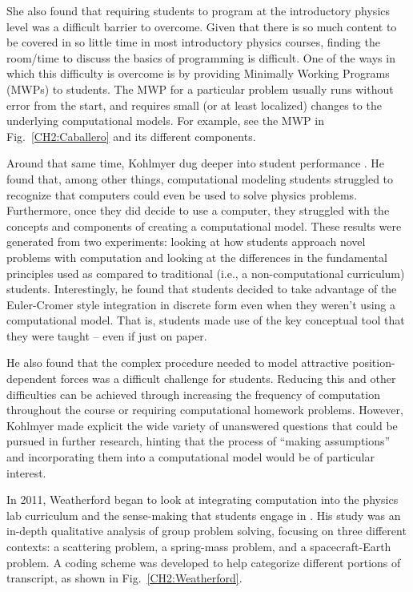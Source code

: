 \documentclass{msuphddissertation}
\begin{document}
\begin{doublespace}
She also found that requiring students to program at the introductory physics level was a difficult barrier to overcome.  Given that there is so much content to be covered in so little time in most introductory physics courses, finding the room/time to discuss the basics of programming is difficult.  One of the ways in which this difficulty is overcome is by providing Minimally Working Programs (MWPs) to students.  The MWP for a particular problem usually runs without error from the start, and requires small (or at least localized) changes to the underlying computational models.  For example, see the MWP in Fig.~\ref{CH2:Caballero} and its different components.

Around that same time, Kohlmyer dug deeper into student performance \cite{Kohlmyer2005}.  He found that, among other things, computational modeling students struggled to recognize that computers could even be used to solve physics problems.  Furthermore, once they did decide to use a computer, they struggled with the concepts and components of creating a computational model.  These results were generated from two experiments: looking at how students approach novel problems with computation and looking at the differences in the fundamental principles used as compared to traditional (i.e., a non-computational curriculum) students.  Interestingly, he found that students decided to take advantage of the Euler-Cromer style integration in discrete form even when they weren't using a computational model.  That is, students made use of the key conceptual tool that they were taught -- even if just on paper.

He also found that the complex procedure needed to model attractive position-dependent forces was a difficult challenge for students.  Reducing this and other difficulties can be achieved through increasing the frequency of computation throughout the course or requiring computational homework problems.  However, Kohlmyer made explicit the wide variety of unanswered questions that could be pursued in further research, hinting that the process of ``making assumptions'' and incorporating them into a computational model would be of particular interest.

In 2011, Weatherford began to look at integrating computation into the physics lab curriculum and the sense-making that students engage in \cite{Weatherford2011}.  His study was an in-depth qualitative analysis of group problem solving, focusing on three different contexts: a scattering problem, a spring-mass problem, and a spacecraft-Earth problem.  A coding scheme was developed to help categorize different portions of transcript, as shown in Fig.~\ref{CH2:Weatherford}.


\end{doublespace}
\end{document}
